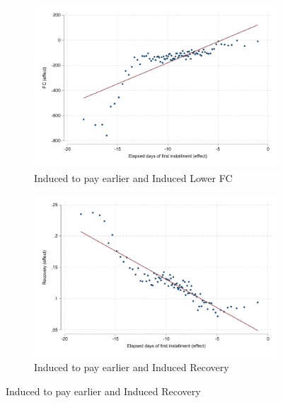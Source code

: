 \documentclass[11pt]{article}
\begin{document}
\begin{figure}[H]
    \caption{Relationship between treatment effects}
    \label{binscatter}
    \begin{center}
    \begin{subfigure}{0.45\textwidth}
        \caption{\footnotesize{Induced to pay earlier and Induced Lower FC}}
        \centering
        \includegraphics[width=\textwidth]{Figuras/binscatter_fc_days_pro_2.pdf}
    \end{subfigure}
        \begin{subfigure}{0.45\textwidth}
        \caption{\footnotesize{Induced to pay earlier and Induced Recovery}}
        \centering
        \includegraphics[width=\textwidth]{Figuras/binscatter_def_days_pro_2.pdf}
    \end{subfigure}
    \end{center}
       \scriptsize 

\end{figure}
\end{document}
